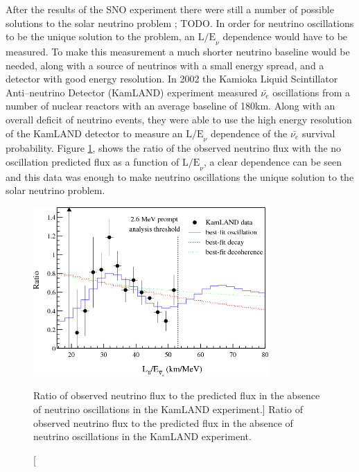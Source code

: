 After the results of the SNO experiment there were still a number of possible
solutions to the solar neutrino problem \cite{Smirnov2016}; TODO. In order for
neutrino oscillations to be the unique solution to the problem, an
\(\mbox{L/E}_\nu\) dependence would have to be measured. To make this
measurement a much shorter neutrino baseline would be needed, along with a
source of neutrinos with a small energy spread, and a detector with good energy
resolution. In 2002 the Kamioka Liquid Scintillator Anti--neutrino Detector
(KamLAND) experiment measured \(\bar{\nu_e}\) oscillations from a number of
nuclear reactors with an average baseline of 180km. Along with an overall
deficit of neutrino events, they were able to use the high energy resolution of
the KamLAND detector to measure an \(\mbox{L/E}_\nu\) dependence of the 
\(\bar{\nu_e}\) survival probability. Figure \ref{fig:kamland_spectrum},
shows the ratio of the observed neutrino flux with the no oscillation predicted
flux as a function of \(\mbox{L/E}_\nu\), a clear dependence can be seen and
this data was enough to make neutrino oscillations the unique solution to the
solar neutrino problem.

\begin{figure}

	\centering

	\includegraphics[width=0.8\textwidth]{figures/kamland_spec.png}

	\caption
	[Ratio of observed neutrino flux to the predicted flux in the absence of
	neutrino oscillations in the KamLAND experiment.]
	{Ratio of observed neutrino flux to the predicted flux in the absence of
	neutrino oscillations in the KamLAND experiment.}

	\label{fig:kamland_spectrum}

\end{figure}

